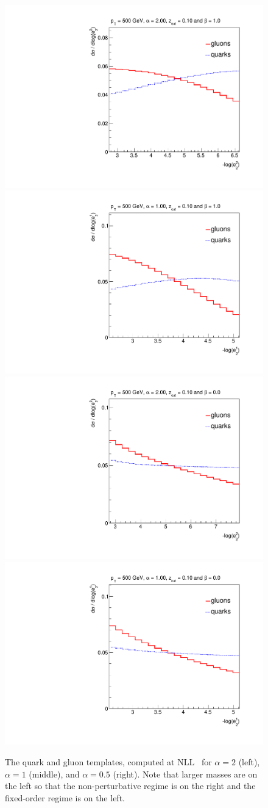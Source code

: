 \begin{figure}[t]
\begin{center}
\includegraphics[width = 0.49\columnwidth]{figures/PDFs_alpha_20zcut1_beta_1023451324.pdf}\includegraphics[width = 0.49\columnwidth]{figures/PDFs_alpha_10zcut1_beta_1023451324.pdf}\\
\includegraphics[width = 0.49\columnwidth]{figures/PDFs_alpha_20zcut1_beta_023451324.pdf}\includegraphics[width = 0.49\columnwidth]{figures/PDFs_alpha_10zcut1_beta_023451324.pdf}
\end{center}
\caption{The quark and gluon templates, computed at NLL~\cite{Marzani:2017mva,Marzani:2017kqd} for $\alpha=2$ (left),
  $\alpha=1$ (middle), and $\alpha=0.5$ (right).  Note that larger masses are on the left so that the non-perturbative regime is on the
  right and the fixed-order regime is on the left.}
\label{fig:templates}
\end{figure}
	
